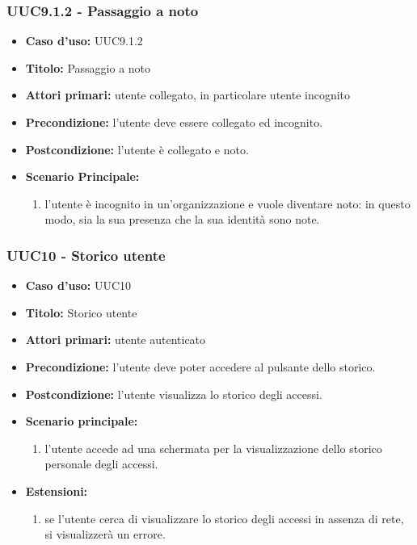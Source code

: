 \documentclass[casi-duso]{subfiles}
\begin{document}
\subsubsection{UUC9.1.2 - Passaggio a noto}%
\label{subsub:UUC9.1.2utente}
\begin{itemize}
  \item \textbf{Caso d’uso:} UUC9.1.2
  \item \textbf{Titolo:} Passaggio a noto
  \item \textbf{Attori primari:} utente collegato, in particolare utente incognito
  \item \textbf{Precondizione:} l'utente deve essere collegato ed incognito.
  \item \textbf{Postcondizione:} l'utente è collegato e noto.
  \item \textbf{Scenario Principale:}
        \begin{enumerate}
          \item l'utente è incognito in un'organizzazione e vuole diventare noto: in questo modo, sia la sua presenza che la sua identità sono note.
        \end{enumerate}
\end{itemize}

\subsubsection{UUC10 - Storico utente}%
\label{subsub:UUC10utente}
\begin{itemize}
  \item \textbf{Caso d’uso:} UUC10
  \item \textbf{Titolo:} Storico utente
  \item \textbf{Attori primari:} utente autenticato
  \item \textbf{Precondizione:}  l'utente deve poter accedere al pulsante dello storico.
  \item \textbf{Postcondizione:} l'utente visualizza lo storico degli accessi.
  \item \textbf{Scenario principale:}
        \begin{enumerate}
          \item l'utente accede ad una schermata per la visualizzazione dello storico personale degli accessi.
        \end{enumerate}
  \item \textbf{Estensioni:}
        \begin{enumerate}
          \item se l'utente cerca di visualizzare lo storico degli accessi in assenza di rete, si visualizzerà un errore.
        \end{enumerate}
\end{itemize}
\end{document}
